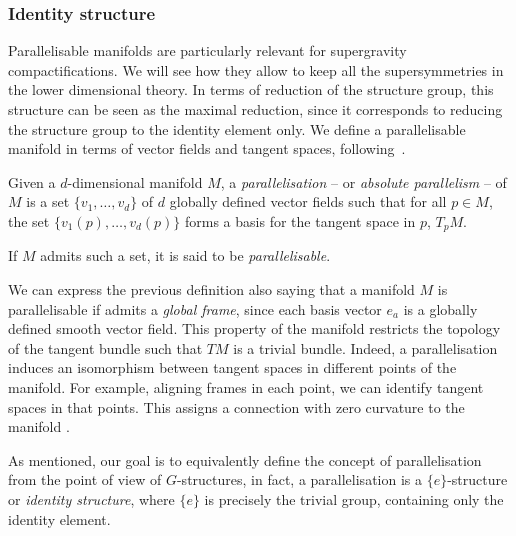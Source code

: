 \documentclass[debug]{phd}
\begin{document}
					\subsubsection{Identity structure}
						Parallelisable manifolds are particularly relevant for supergravity compactifications.
						We will see how they allow to keep all the supersymmetries in the lower dimensional theory.
						In terms of reduction of the structure group, this structure can be seen as the maximal reduction, since it corresponds to reducing the structure group to the identity element only.
						We define a parallelisable manifold in terms of vector fields and tangent spaces, following~\cite{Nakahara}.
						
						Given a $d$-dimensional manifold $M$, a \emph{parallelisation} -- or \emph{absolute parallelism} --  of $M$ is a set $\{ v_1 ,\ldots, v_d\}$ of $d$ globally defined vector fields such that for all $p \in M$, the set $\{ v_1(p) ,\ldots, v_d(p)\} $ forms a basis for the tangent space in  $p$, $T_p M$.
							
						If $M$ admits such a set, it is said to be \emph{parallelisable}.

						We can express the previous definition also saying that a manifold $M$ is parallelisable if admits a \emph{global frame}, since each basis vector $e_a$ is a globally defined smooth vector field.
						This property of the manifold restricts the topology of the tangent bundle such that $TM$ is a trivial bundle.
						Indeed, a parallelisation induces an isomorphism between tangent spaces in different points of the manifold.
						For example, aligning frames in each point, we can identify tangent spaces in that points. 
						This assigns a connection with zero curvature to the manifold \cite{paar}.
						
						As mentioned, our goal is to equivalently define the concept of parallelisation from the point of view of $G$-structures, in fact, a parallelisation is a $\{e\}$-structure or \emph{identity structure}, where $\{e\}$ is precisely the trivial group, containing only the identity element.
						
\end{document}
